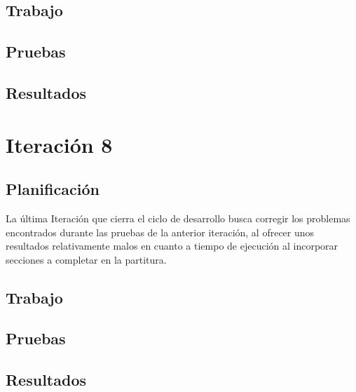 \subsection{Trabajo}

\subsection{Pruebas}

\subsection{Resultados}

\section{Iteración 8}
\subsection{Planificación}
La última Iteración que cierra el ciclo de desarrollo busca corregir los problemas encontrados durante las pruebas de la anterior iteración, al ofrecer unos resultados relativamente malos en cuanto a tiempo de ejecución al incorporar secciones a completar en la partitura.

\subsection{Trabajo}


\subsection{Pruebas}

\subsection{Resultados}

